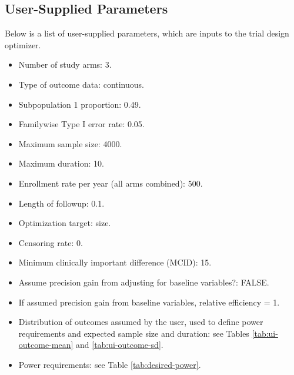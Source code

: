 \documentclass{article}\usepackage[]{graphicx}\usepackage[]{color}
\numberwithin{table}{section}
\numberwithin{figure}{section}
\begin{document}
\subsection{User-Supplied Parameters} \label{sec:user-supplied-parameters}

Below is a list of user-supplied parameters, which are inputs to the trial design optimizer.
\begin{itemize}
    \item Number of study arms: 3.
    \item Type of outcome data: continuous.
    
    \item Subpopulation 1 proportion: 0.49.
    \item Familywise Type I error rate: 0.05.
    \item Maximum sample size: 4000.
    \item Maximum duration: 10.
    \item Enrollment rate per year (all arms combined): 500.
    \item Length of followup: 0.1.
    \item Optimization target: size.
    \item Censoring rate: 0.
    \item Minimum clinically important difference (MCID): 15.
    \item Assume precision gain from adjusting for baseline variables?: FALSE.
    \item If assumed precision gain from baseline variables, relative efficiency = 1.
    \item Distribution of outcomes assumed by the user, used to define power requirements and expected sample size and duration: see Tables \ref{tab:ui-outcome-mean} and \ref{tab:ui-outcome-sd}.
    \item Power requirements: see Table \ref{tab:desired-power}.
    
\end{itemize}
\end{document}
